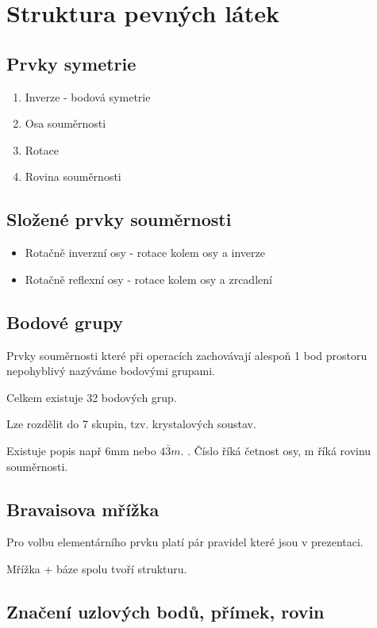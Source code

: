 \documentclass[../main.tex]{subfiles}
\begin{document}
\section{Struktura pevných látek}
\subsection{Prvky symetrie}

\begin{enumerate}
    \item Inverze - bodová symetrie
    \item Osa souměrnosti
    \item Rotace
    \item Rovina souměrnosti
\end{enumerate}


\subsection{Složené prvky souměrnosti}

\begin{itemize}
    \item Rotačně inverzní osy - rotace kolem osy a inverze
    \item Rotačně reflexní osy - rotace kolem osy a zrcadlení
\end{itemize}


\subsection{Bodové grupy}
Prvky souměrnosti které při operacích zachovávají alespoň 1 bod prostoru nepohyblivý nazýváme bodovými grupami. 

Celkem existuje 32 bodových grup. 

Lze rozdělit do 7 skupin, tzv. krystalových soustav. 

Existuje popis např 6mm nebo $4\bar{3}m$. . 
Číslo říká četnost osy, m říká rovinu souměrnosti. 

\subsection{Bravaisova mřížka}
Pro volbu elementárního prvku platí pár pravidel které jsou v prezentaci.

Mřížka + báze spolu tvoří strukturu. 


\subsection{Značení uzlových bodů, přímek, rovin}
\end{document}
